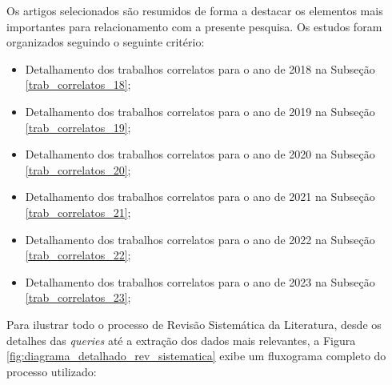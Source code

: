 Os artigos selecionados são resumidos de forma a destacar os elementos mais importantes para relacionamento com a presente pesquisa. Os estudos foram organizados seguindo o seguinte critério:

\begin{itemize}
    \item Detalhamento dos trabalhos correlatos para o ano de 2018 na Subseção \ref{trab_correlatos_18};
    
    \item Detalhamento dos trabalhos correlatos para o ano de 2019 na Subseção \ref{trab_correlatos_19};
    
    \item Detalhamento dos trabalhos correlatos para o ano de 2020 na Subseção \ref{trab_correlatos_20};
    
    \item Detalhamento dos trabalhos correlatos para o ano de 2021 na Subseção \ref{trab_correlatos_21};
    
    \item Detalhamento dos trabalhos correlatos para o ano de 2022 na Subseção \ref{trab_correlatos_22};
    
    \item Detalhamento dos trabalhos correlatos para o ano de 2023 na Subseção \ref{trab_correlatos_23};
    
    
\end{itemize}

Para ilustrar todo o processo de Revisão Sistemática da Literatura, desde os detalhes das \textit{queries} até a extração dos dados mais relevantes, a Figura \ref{fig:diagrama_detalhado_rev_sistematica} exibe um fluxograma completo do processo utilizado:

